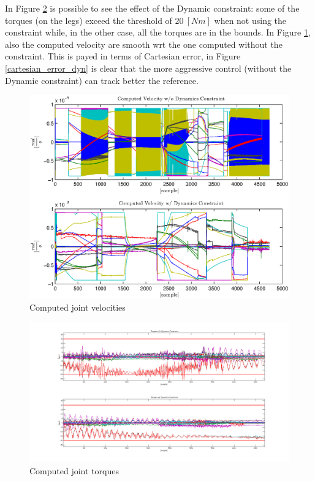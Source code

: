 In Figure \ref{tau_dyn} is possible to see the effect of the Dynamic constraint: some of the torques (on the legs) exceed the threshold of $20 \ [Nm]$ when not using the constraint while, in the other case, all the torques are in the bounds. In Figure \ref{dq_dyn}, also the computed velocity are smooth wrt the one computed without the constraint. This is payed in terms of Cartesian error, in Figure \ref{cartesian_error_dyn} is clear that the more aggressive control (without the Dynamic constraint) can track better the reference.

\begin{figure}
    \centering
        \includegraphics{gfx/dq_dyn.eps} \caption{Computed joint velocities}
        \label{dq_dyn}
\end{figure}
\newpage
\begin{figure}
    \centering
        \includegraphics[width=\textwidth]{gfx/tau_dyn.png}
    \caption{Computed joint torques}\label{tau_dyn}
\end{figure}
\clearpage
